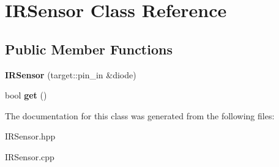\hypertarget{class_i_r_sensor}{}\section{I\+R\+Sensor Class Reference}
\label{class_i_r_sensor}
\subsection*{Public Member Functions}
\begin{DoxyCompactItemize}
\item 
{\bfseries I\+R\+Sensor} (target\+::pin\+\_\+in \&diode)\hypertarget{class_i_r_sensor_a633ce868e9539c0c45f632009b5e785c}{}\label{class_i_r_sensor_a633ce868e9539c0c45f632009b5e785c}

\item 
bool {\bfseries get} ()\hypertarget{class_i_r_sensor_a7eaba52218dcdc0f6a9e1b37ea7518fb}{}\label{class_i_r_sensor_a7eaba52218dcdc0f6a9e1b37ea7518fb}

\end{DoxyCompactItemize}


The documentation for this class was generated from the following files\+:\begin{DoxyCompactItemize}
\item 
I\+R\+Sensor.\+hpp\item 
I\+R\+Sensor.\+cpp\end{DoxyCompactItemize}
